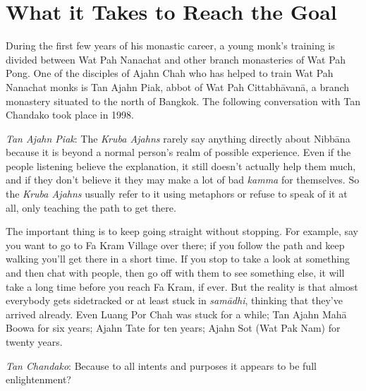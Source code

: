 
\chapter{What it Takes to Reach the Goal}
\markright{\theChapterAuthor}

During the first few years of his monastic career, a young monk's
training is divided between Wat Pah Nanachat and other branch
monasteries of Wat Pah Pong. One of the disciples of Ajahn Chah who has
helped to train Wat Pah Nanachat monks is Tan Ajahn Piak, abbot of Wat
Pah Cittabhāvanā, a branch monastery situated to the north of Bangkok. 
The following conversation with Tan Chandako took place in 1998. 

\emph{Tan Ajahn Piak}: The \emph{Kruba Ajahns} rarely say anything
directly about Nibbāna because it is beyond a normal person's realm of
possible experience. Even if the people listening believe the
explanation, it still doesn't actually help them much, and if they don't
believe it they may make a lot of bad \emph{kamma} for themselves. So
the \emph{Kruba Ajahns} usually refer to it using metaphors or refuse
to speak of it at all, only teaching the path to get there. 

The important thing is to keep going straight without stopping. For
example, say you want to go to Fa Kram Village over there; if you follow
the path and keep walking you'll get there in a short time. If you stop
to take a look at something and then chat with people, then go off with
them to see something else, it will take a long time before you reach Fa
Kram, if ever. But the reality is that almost everybody gets sidetracked
or at least stuck in \emph{samādhi}, thinking that they've arrived
already. Even Luang Por Chah was stuck for a while; Tan Ajahn Mahā Boowa
for six years; Ajahn Tate for ten years; Ajahn Sot (Wat Pak Nam) for
twenty years. 

\emph{Tan Chandako}: Because to all intents and purposes it appears to
be full enlightenment? 

